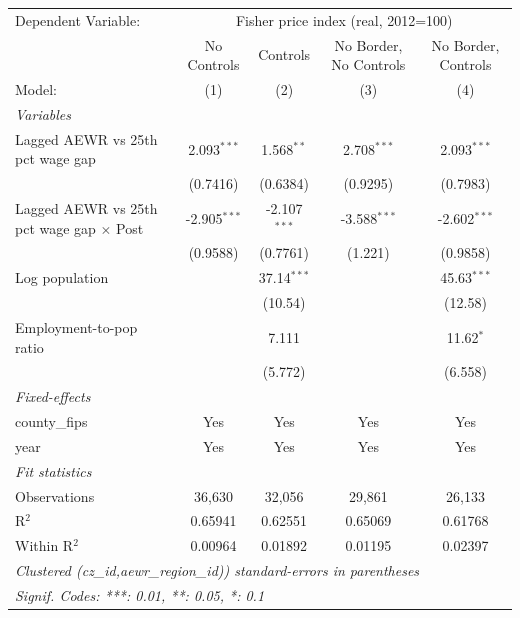 
\begingroup
\centering
\begin{tabular}{lcccc}
   \tabularnewline \midrule \midrule
   Dependent Variable: & \multicolumn{4}{c}{Fisher price index (real, 2012=100)}\\
                                                   & No Controls    & Controls       & No Border, No Controls & No Border, Controls \\   
   Model:                                          & (1)            & (2)            & (3)                    & (4)\\  
   \midrule
   \emph{Variables}\\
   Lagged AEWR vs 25th pct wage gap                & 2.093$^{***}$  & 1.568$^{**}$   & 2.708$^{***}$          & 2.093$^{***}$\\   
                                                   & (0.7416)       & (0.6384)       & (0.9295)               & (0.7983)\\   
   Lagged AEWR vs 25th pct wage gap $\times$ Post  & -2.905$^{***}$ & -2.107$^{***}$ & -3.588$^{***}$         & -2.602$^{***}$\\   
                                                   & (0.9588)       & (0.7761)       & (1.221)                & (0.9858)\\   
   Log population                                  &                & 37.14$^{***}$  &                        & 45.63$^{***}$\\   
                                                   &                & (10.54)        &                        & (12.58)\\   
   Employment-to-pop ratio                         &                & 7.111          &                        & 11.62$^{*}$\\   
                                                   &                & (5.772)        &                        & (6.558)\\   
   \midrule
   \emph{Fixed-effects}\\
   county\_fips                                    & Yes            & Yes            & Yes                    & Yes\\  
   year                                            & Yes            & Yes            & Yes                    & Yes\\  
   \midrule
   \emph{Fit statistics}\\
   Observations                                    & 36,630         & 32,056         & 29,861                 & 26,133\\  
   R$^2$                                           & 0.65941        & 0.62551        & 0.65069                & 0.61768\\  
   Within R$^2$                                    & 0.00964        & 0.01892        & 0.01195                & 0.02397\\  
   \midrule \midrule
   \multicolumn{5}{l}{\emph{Clustered (cz\_id,aewr\_region\_id)) standard-errors in parentheses}}\\
   \multicolumn{5}{l}{\emph{Signif. Codes: ***: 0.01, **: 0.05, *: 0.1}}\\
\end{tabular}
\par\endgroup



